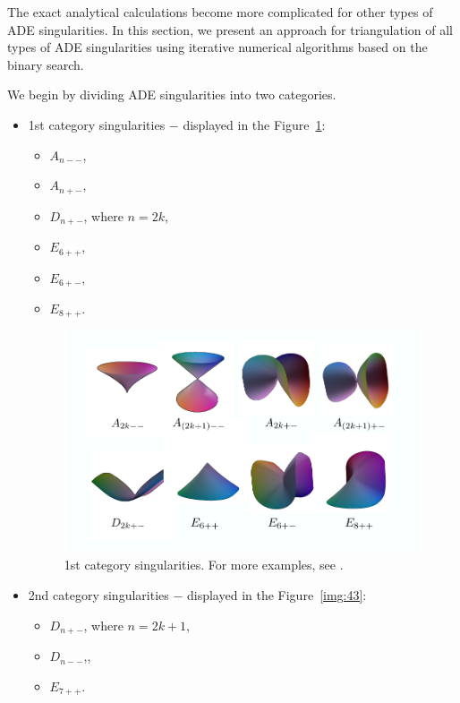 The exact analytical calculations become more
complicated for other types of ADE singularities. In this section, we present an approach for triangulation of all types
of ADE singularities using iterative numerical algorithms based on the binary 
search.

We begin by dividing ADE singularities into two categories.
\begin{itemize}
    \item 1st category singularities $-$ displayed in the Figure~\ref{img:42}:
    \begin{itemize}
        \item $A_{n--}$,
        \item $A_{n+-}$,
        \item $D_{n+-}$, where $n=2k$,
        \item $E_{6++}$, 
        \item $E_{6+-}$,
        \item $E_{8++}$.
    \end{itemize}
    \begin{figure}
        \centerline{\includegraphics[scale=0.5]{images/img42}}
        \caption[1st category singularities]
        {1st category singularities. For more examples, see \cite{morris2003client}.}
        \label{img:42}
    \end{figure}
    \item 2nd category singularities $-$ displayed in the Figure~\ref{img:43}:
    \begin{itemize}
        \item $D_{n+-}$, where $n=2k+1$,
        \item $D_{n--}$,,
        \item $E_{7++}$.

\end{itemize}
\end{itemize}
